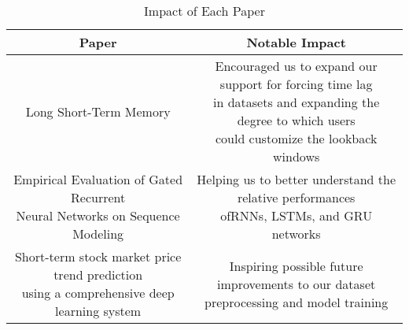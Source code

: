 \documentclass{article}
\begin{document}
    \begin{table}[h!]
        \begin{center}
            \caption{Impact of Each Paper}
            \label{tab:paperSummary}
            \bgroup
            \def\arraystretch{3}
            \begin{tabular}{c|c}
                \textbf{Paper} & \textbf{Notable Impact}\\
                \hline
                Long Short-Term Memory\cite{LSTM} & \makecell{Encouraged us to expand our support for forcing time lag\\
                    in datasets and expanding the degree to which users\\could customize the lookback windows}\\
                \hline
                \makecell{Empirical Evaluation of Gated Recurrent\\Neural Networks on Sequence Modeling\cite{recurrentModeling}} &
                    \makecell{Helping us to better understand the relative performances\\ofRNNs, LSTMs, and GRU networks}\\
                \hline
                \makecell{Short-term stock market price trend prediction\\using a comprehensive deep learning system\cite{deepPrediction}} &
                    \makecell{Inspiring possible future improvements to our dataset\\preprocessing and model training}\\

            \end{tabular}
            \egroup
        \end{center}
    \end{table}

    \pagebreak
    
    
\end{document}
